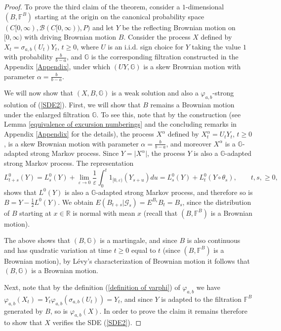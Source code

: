 \documentclass[reqno]{amsart}
\theoremstyle{definition}
\theoremstyle{remark}
\numberwithin{equation}{section}
\begin{document}
\begin{proof}
To prove the third claim of the theorem, consider a $1$-dimensional $(B,\mathbb{F}^B)$ starting at the origin on the canonical probability space $(C[0,\infty),\mathcal{B}(C[0,\infty)),P)$ and let $Y$ be the reflecting Brownian motion on $[0,\infty )$ with driving Brownian motion $B$. Consider the process $X$ defined by $X_{t}=\sigma _{a,b}\left( U_{t}\right) Y_{t}$, $t\ge 0$, where $U$ is an i.i.d. sign choice for $Y$ taking the value $1$ with probability $\frac{b}{b-a}$, and $\mathbb{G}$ is the corresponding filtration constructed in the Appendix \ref{Appendix}, under which $(UY,\mathbb{G})$ is a skew Brownian motion with parameter $\alpha=\frac{b}{b-a}$.

We will now show that $\left( X,B,\mathbb{G}\right)$ is a weak solution and also a $\varphi _{a,b}$-strong solution of (\ref{SDE2}). First, we will show that $B$ remains a Brownian motion under the enlarged filtration $\mathbb{G}$. To see this, note that by the construction (see Lemma \ref{equivalence of excursion numberings} and the concluding remarks in Appendix \ref{Appendix} for the details), the process $X^\alpha$ defined by $X^\alpha_t=U_t Y_t$, $t\ge 0$, is a skew Brownian motion with parameter $\alpha=\frac{b}{b-a}$, and moreover $X^\alpha$ is a $\mathbb{G}$-adapted strong Markov process. Since $Y=\vert X^\alpha\vert$, the process $Y$ is also a $\mathbb{G}$-adapted strong Markov process. The representation $$L_{t+s}^0 (Y)=L_s^0(Y)+\lim_{\varepsilon\rightarrow 0} \frac{1}{\varepsilon}\int_0^{t} 1_{[0,\varepsilon)}(Y_{s+u}) du=L_s^0(Y)+L_t^0(Y\circ\theta_s), \qquad t,s,\ge 0,$$  shows that $L^0(Y)$ is also a $\mathbb{G}$-adapted strong Markov process, and therefore so is $B=Y-\frac12L^0(Y)$. We obtain $E(B_{t+s}\vert \mathcal{G}_s)=E^{B_s} B_t=B_s$, since the distribution of $B$ starting at $x\in\mathbb R$ is normal with mean $x$ (recall that $(B,\mathbb{F}^B)$ is a Brownian motion).


The above shows that $(B,\mathbb{G})$ is a martingale, and since $B$ is also continuous and has quadratic variation at time $t\ge 0$ equal to $t$ (since $\left(B,\mathbb{F}^B\right)$ is a Brownian motion), by L\'{e}vy's characterization of Brownian motion it follows that $(B,\mathbb{G})$ is a Brownian motion.

Next, note that by the definition (\ref{definition of varphi}) of $\varphi_{a,b}$ we have  $\varphi_{a,b}(X_t)=Y_t \varphi_{a,b}(\sigma_{a,b}(U_t))=Y_t$, and since $Y$ is adapted to the filtration $\mathbb{F}^B$ generated by $B$, so is $\varphi_{a,b}(X)$. In order to prove the claim it remains therefore to show that $X$ verifies the SDE (\ref{SDE2}).


\end{proof}
\end{document}

